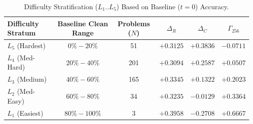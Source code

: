 \begin{table}[t]
\centering
\caption{Difficulty Stratification ($L_1..L_5$) Based on Baseline ($t=0$) Accuracy.}
\label{tab:difficulty}
\begin{tabular}{lccccc}
\toprule
Difficulty Stratum & Baseline Clean Range & Problems ($N$) & $\Delta_R$ & $\Delta_C$ & $\Gamma_{256}$ \\
\midrule
$L_5$ (Hardest)   & $0\% - 20\%$   & 51  & $+0.3125$ & $+0.3836$ & $-0.0711$ \\
$L_4$ (Med-Hard)  & $20\% - 40\%$  & 201 & $+0.3094$ & $+0.2587$ & $+0.0507$ \\
$L_3$ (Medium)    & $40\% - 60\%$  & 165 & $+0.3345$ & $+0.1322$ & $+0.2023$ \\
$L_2$ (Med-Easy)  & $60\% - 80\%$  & 34  & $+0.3235$ & $-0.0129$ & $+0.3364$ \\
$L_1$ (Easiest)   & $80\% - 100\%$ & 3   & $+0.3958$ & $-0.2708$ & $+0.6667$ \\
\bottomrule
\end{tabular}
\end{table}
